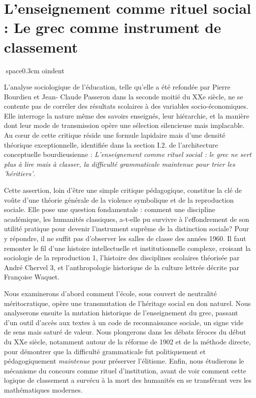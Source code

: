 

\section{L'enseignement comme rituel social : Le grec comme instrument de classement}
space{0.3cm}
oindent

L'analyse sociologique de l'éducation, telle qu'elle a été refondée par Pierre Bourdieu et Jean-
Claude Passeron dans la seconde moitié du XXe siècle, ne se contente pas de corréler des résultats
scolaires à des variables socio-économiques. Elle interroge la nature même des savoirs enseignés,
leur hiérarchie, et la manière dont leur mode de transmission opère une sélection silencieuse mais
implacable. Au cœur de cette critique réside une formule lapidaire mais d'une densité théorique
exceptionnelle, identifiée dans la section I.2.\cite{I-2-3-ref3} de l'architecture conceptuelle
bourdieusienne : \textit{\og L'enseignement comme rituel social : le grec ne sert plus à lire mais à
classer, la difficulté grammaticale maintenue pour trier les 'héritiers'\fg{}}.

Cette assertion, loin d'être une simple critique pédagogique, constitue la clé de voûte d'une
théorie générale de la violence symbolique et de la reproduction sociale. Elle pose une question
fondamentale : comment une discipline académique, les humanités classiques, a-t-elle pu survivre à
l'effondrement de son utilité pratique pour devenir l'instrument suprême de la distinction sociale?
Pour y répondre, il ne suffit pas d'observer les salles de classe des années 1960. Il faut remonter
le fil d'une histoire intellectuelle et institutionnelle complexe, croisant la sociologie de la
reproduction 1, l'histoire des disciplines scolaires théorisée par André Chervel 3, et
l'anthropologie historique de la culture lettrée décrite par Françoise Waquet.\cite{I-2-3-ref5}

Nous
examinerons d'abord comment l'école, sous couvert de neutralité méritocratique, opère une
transmutation de l'héritage social en don naturel. Nous analyserons ensuite la mutation historique
de l'enseignement du grec, passant d'un outil d'accès aux textes à un code de reconnaissance
sociale, un \og signe\fg{} vide de sens mais saturé de valeur. Nous plongerons dans les débats
féroces du début du XXe siècle, notamment autour de la réforme de 1902 et de la méthode directe,
pour démontrer que la difficulté grammaticale fut politiquement et pédagogiquement
\textit{maintenue} pour préserver l'élitisme. Enfin, nous étudierons le mécanisme du concours comme
rituel d'institution, avant de voir comment cette logique de classement a survécu à la mort des
humanités en se transférant vers les mathématiques modernes.



